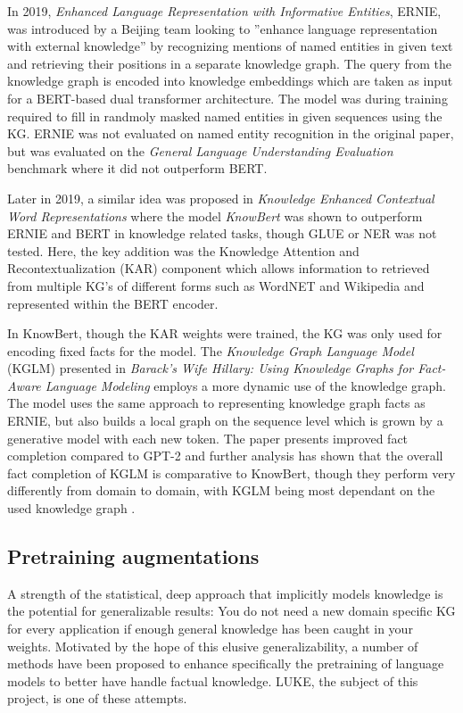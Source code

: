 \documentclass[main.tex]{subfiles}
\begin{document}
In 2019, \emph{Enhanced Language Representation with Informative Entities}, ERNIE, was introduced by a Beijing team \cite{zhang2019ernie} looking to ''enhance language representation  with  external  knowledge'' \cite[1]{zhang2019ernie} by recognizing mentions of named entities in given text and retrieving their positions in a separate knowledge graph.
The query from the knowledge graph is encoded into knowledge embeddings which are taken as input for a BERT-based dual transformer architecture.
The model was during training required to fill in randmoly masked named entities in given sequences using the KG.
ERNIE was not evaluated on named entity recognition in the original paper, but was evaluated on the \emph{General Language Understanding Evaluation} benchmark \cite{wang2018glue} where it did not outperform BERT.

Later in 2019, a similar idea was proposed in \emph{Knowledge Enhanced Contextual Word Representations} where the model \emph{KnowBert} \cite{peters2019knowbert} was shown to outperform ERNIE and BERT in knowledge related tasks, though GLUE or NER was not tested.
Here, the key addition was the Knowledge Attention and Recontextualization (KAR) component which allows information to retrieved from multiple KG's of different forms such as WordNET and Wikipedia and represented within the BERT encoder.

In KnowBert, though the KAR weights were trained, the KG was only used for encoding fixed facts for the model.
The \emph{Knowledge Graph Language Model} (KGLM) presented in \emph{Barack’s Wife Hillary: Using Knowledge Graphs for Fact-Aware Language Modeling} \cite{logan2019barack} employs a more dynamic use of the knowledge graph.
The model uses the same approach to representing knowledge graph facts as ERNIE, but also builds a local graph on the sequence level which is grown by a generative model with each new token.
The paper presents improved fact completion compared to GPT-2 and further analysis has shown that the overall fact completion of KGLM is comparative to KnowBert, though they perform very differently from domain to domain, with KGLM being most dependant on the used knowledge graph \cite{birk2020knowledge}.

\subsection{Pretraining augmentations}
A strength of the statistical, deep approach that implicitly models knowledge is the potential for generalizable results:
You do not need a new domain specific KG for every application if enough general knowledge has been caught in your weights.
Motivated by the hope of this elusive generalizability, a number of methods have been proposed to enhance specifically the pretraining of language models to better have handle factual knowledge.
LUKE, the subject of this project, is one of these attempts.
\end{document}
